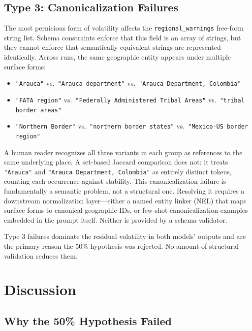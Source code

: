 \documentclass[sigconf]{acmart}
\begin{document}
\subsection{Type 3: Canonicalization Failures}

The most pernicious form of volatility affects the \texttt{regional\_warnings} free-form string list. Schema constraints enforce that this field is an array of strings, but they cannot enforce that semantically equivalent strings are represented identically. Across runs, the same geographic entity appears under multiple surface forms:

\begin{itemize}
  \item \texttt{"Arauca"} vs.\ \texttt{"Arauca department"} vs.\ \texttt{"Arauca Department, Colombia"}
  \item \texttt{"FATA region"} vs.\ \texttt{"Federally Administered Tribal Areas"} vs.\ \texttt{"tribal border areas"}
  \item \texttt{"Northern Border"} vs.\ \texttt{"northern border states"} vs.\ \texttt{"Mexico-US border region"}
\end{itemize}

A human reader recognizes all three variants in each group as references to the same underlying place. A set-based Jaccard comparison does not: it treats \texttt{"Arauca"} and \texttt{"Arauca Department, Colombia"} as entirely distinct tokens, counting each occurrence against stability. This canonicalization failure is fundamentally a semantic problem, not a structural one. Resolving it requires a downstream normalization layer---either a named entity linker (NEL) that maps surface forms to canonical geographic IDs, or few-shot canonicalization examples embedded in the prompt itself. Neither is provided by a schema validator.

Type 3 failures dominate the residual volatility in both models' outputs and are the primary reason the 50\% hypothesis was rejected. No amount of structural validation reduces them.

\section{Discussion}
\label{sec:discussion}

\subsection{Why the 50\% Hypothesis Failed}
\end{document}
